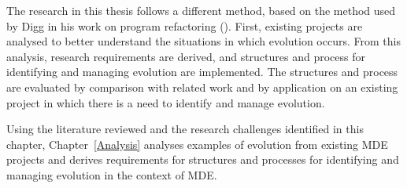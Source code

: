 The research in this thesis follows a different method, based on the method used by Digg in his work on program refactoring (\cite{dig06apis,dig06automatic,dig06detection,dig07cms}). First, existing projects are analysed to better understand the situations in which evolution occurs. From this analysis, research requirements are derived, and structures and process for identifying and managing evolution are implemented. The structures and process are evaluated by comparison with related work and by application on an existing project in which there is a need to identify and manage evolution.

Using the literature reviewed and the research challenges identified in this chapter, Chapter~\ref{Analysis} analyses examples of evolution from existing MDE projects and derives requirements for structures and processes for identifying and managing evolution in the context of MDE. 